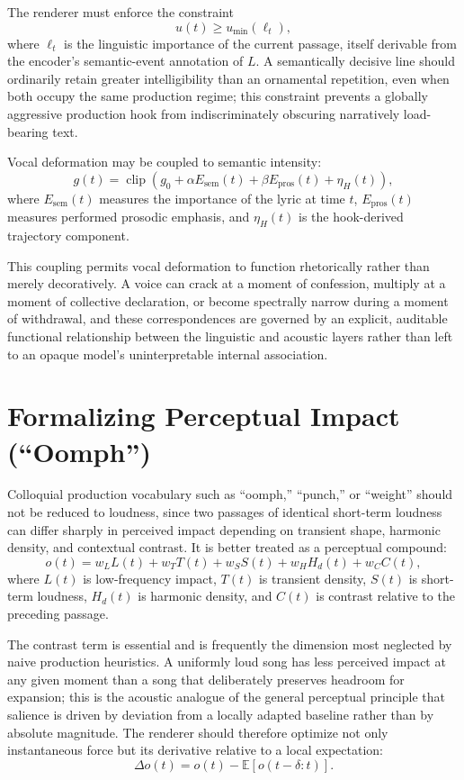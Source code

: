 \documentclass[11pt]{article}
\DeclareMathOperator{\clip}{clip}
\begin{document}
The renderer must enforce the constraint
\[
u(t)\geq u_{\min}(\ell_t),
\]
where $\ell_t$ is the linguistic importance of the current passage, itself derivable from the encoder's semantic-event annotation of $L$. A semantically decisive line should ordinarily retain greater intelligibility than an ornamental repetition, even when both occupy the same production regime; this constraint prevents a globally aggressive production hook from indiscriminately obscuring narratively load-bearing text.

Vocal deformation may be coupled to semantic intensity:
\[
g(t)=
\clip
\left(
g_0+\alpha E_{\mathrm{sem}}(t)+\beta E_{\mathrm{pros}}(t)+\eta_H(t)
\right),
\]
where $E_{\mathrm{sem}}(t)$ measures the importance of the lyric at time $t$, $E_{\mathrm{pros}}(t)$ measures performed prosodic emphasis, and $\eta_H(t)$ is the hook-derived trajectory component.

This coupling permits vocal deformation to function rhetorically rather than merely decoratively. A voice can crack at a moment of confession, multiply at a moment of collective declaration, or become spectrally narrow during a moment of withdrawal, and these correspondences are governed by an explicit, auditable functional relationship between the linguistic and acoustic layers rather than left to an opaque model's uninterpretable internal association.

\section{Formalizing Perceptual Impact (``Oomph'')}
\label{sec:oomph}

Colloquial production vocabulary such as ``oomph,'' ``punch,'' or ``weight'' should not be reduced to loudness, since two passages of identical short-term loudness can differ sharply in perceived impact depending on transient shape, harmonic density, and contextual contrast. It is better treated as a perceptual compound:
\[
o(t)=
w_L L(t)
+
w_T T(t)
+
w_S S(t)
+
w_H H_d(t)
+
w_C C(t),
\]
where $L(t)$ is low-frequency impact, $T(t)$ is transient density, $S(t)$ is short-term loudness, $H_d(t)$ is harmonic density, and $C(t)$ is contrast relative to the preceding passage.

The contrast term is essential and is frequently the dimension most neglected by naive production heuristics. A uniformly loud song has less perceived impact at any given moment than a song that deliberately preserves headroom for expansion; this is the acoustic analogue of the general perceptual principle that salience is driven by deviation from a locally adapted baseline rather than by absolute magnitude. The renderer should therefore optimize not only instantaneous force but its derivative relative to a local expectation:
\[
\Delta o(t)=o(t)-\mathbb{E}[o(t-\delta:t)].
\]
\end{document}
